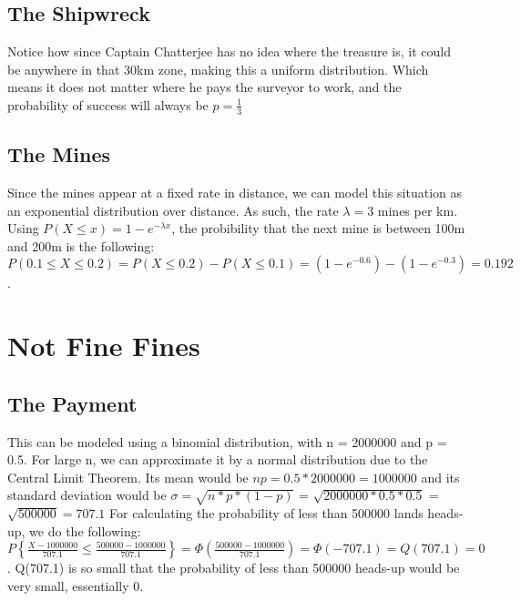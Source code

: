 \documentclass{exam}
\begin{document}
\subsection{The Shipwreck}
Notice how since Captain Chatterjee has no idea where the treasure is, it could be anywhere in that 30km zone, making this a uniform distribution. Which means it does not matter where he pays the surveyor to work, and the probability of success will always be $p=\frac{1}{3}$

\subsection{The Mines}
Since the mines appear at a fixed rate in distance, we can model this situation as an exponential distribution over distance. As such, the rate $\lambda = 3$ mines per km. Using $P(X \leq x) = 1 - e^{-\lambda x}$, the probibility that the next mine is between 100m and 200m is the following: $P (0.1 \leq X \leq 0.2) = P(X \leq 0.2) - P(X \leq 0.1) = (1-e^{-0.6}) - (1-e^{-0.3}) = 0.192$.

\newpage
\section{Not Fine Fines}
\subsection{The Payment}
This can be modeled using a binomial distribution,  with n = 2000000 and p = 0.5. For large n, we can approximate it by a normal distribution due to the Central Limit Theorem. Its mean would be $np = 0.5*2000000 = 1000000$ and its standard deviation would be $\sigma = \sqrt{n*p*(1-p)}$ = $\sqrt{2000000*0.5*0.5}$ = $\sqrt{500000} = 707.1$
For calculating the probability of less than 500000 lands heads-up, we do the following: $P \left\{ \frac{X - 1000000}{707.1} \leq \frac{500000 - 1000000}{707.1} \right\} = \Phi(\frac{500000 - 1000000}{707.1}) = \Phi(-707.1) = Q(707.1) = 0$. Q(707.1) is so small that the probability of less than 500000 heads-up would be very small, essentially 0.  
\end{document}
